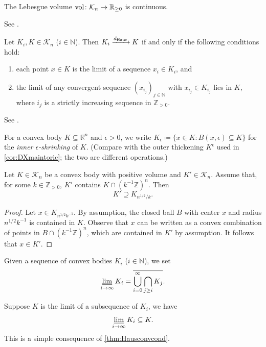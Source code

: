 \begin{theorem}\label{thm:contvol}
	The Lebesgue volume $\operatorname{vol}\colon \mathcal{K}_n\rightarrow \mathbb{R}_{\geq 0}$ is continuous.
\end{theorem}
See \cite[Theorem~1.8.20]{Sch14}.

\begin{theorem}\label{thm:Hausconvcond}
	Let $K_i, K\in \mathcal{K}_n$ ($i\in \mathbb{N}$). Then $K_i\xrightarrow{d_{\mathrm{Haus}}}K$ if and only if the following conditions hold:
	\begin{enumerate}
		\item\label{itm:thm:Hausconvcond:1} each point $x\in K$ is the limit of a sequence $x_i\in K_i$, and
		\item\label{itm:thm:Hausconvcond:2} the limit of any convergent sequence $(x_{i_j})_{j\in \mathbb{N}}$ with $x_{i_j}\in K_{i_j}$ lies in $K$, where $i_j$ is a strictly increasing sequence in $\mathbb{Z}_{>0}$.
	\end{enumerate}
\end{theorem}
See \cite[Theorem~1.8.8]{Sch14}.


For a convex body $K\subseteq \mathbb{R}^n$ and $\epsilon>0$, we write $K_\epsilon\coloneqq \{x\in K: B(x,\epsilon)\subseteq K\}$ for the \emph{inner $\epsilon$-shrinking} of $K$. (Compare with the outer thickening $K^\epsilon$ used in \cref{cor:DXmaintoric}; the two are different operations.)

\begin{lemma}\label{lma:latcvb}
		Let $K\in \mathcal{K}_n$ be a convex body with positive volume and $K'\in \mathcal{K}_n$. Assume that, for some $k\in \mathbb Z_{>0}$, $K'$ contains $K\cap(k^{-1}\mathbb Z)^n$. Then
    \[
        K'\supseteq K_{n^{1/2}/k}.
    \]
\end{lemma}
\begin{proof}
    Let $x\in K_{n^{1/2}k^{-1}}$. By assumption, the closed ball $B$ with center $x$ and radius $n^{1/2}k^{-1}$ is contained in $K$. Observe that $x$ can be written as a convex combination of points in $B\cap (k^{-1}\mathbb{Z})^n$, which are contained in $K'$ by assumption. It follows that $x\in K'$.
\end{proof}


Given a sequence of convex bodies $K_i$ ($i\in \mathbb{N}$), we set
\[
	\varliminf_{i\to\infty}K_i= \overline{\bigcup_{i=0}^{\infty}\bigcap_{j\geq i}K_j}.
\]

Suppose $K$ is the limit of a subsequence of $K_i$, we have
\begin{equation}\label{eq:liminflimsup}
	\varliminf_{i\to\infty}K_i\subseteq K.
\end{equation}
This is a simple consequence of \cref{thm:Hausconvcond}.

